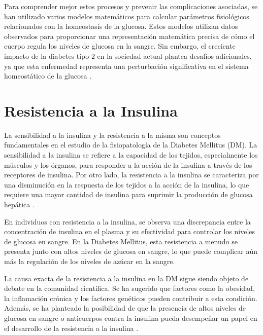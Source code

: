 Para comprender mejor estos procesos y prevenir las complicaciones asociadas, se han utilizado varios modelos matemáticos para calcular parámetros fisiológicos relacionados con la homeostasis de la glucosa. Estos modelos utilizan datos observados para proporcionar una representación matemática precisa de cómo el cuerpo regula los niveles de glucosa en la sangre. Sin embargo, el creciente impacto de la diabetes tipo 2 en la sociedad actual plantea desafíos adicionales, ya que esta enfermedad representa una perturbación significativa en el sistema homeostático de la glucosa \cite{ModelacionMatematica2020}.


\section{Resistencia a la Insulina}

La sensibilidad a la insulina y la resistencia a la misma son conceptos fundamentales en el estudio de la fisiopatología de la Diabetes Mellitus (DM). La sensibilidad a la insulina se refiere a la capacidad de los tejidos, especialmente los músculos y los órganos, para responder a la acción de la insulina a través de los receptores de insulina. Por otro lado, la resistencia a la insulina se caracteriza por una disminución en la respuesta de los tejidos a la acción de la insulina, lo que requiere una mayor cantidad de insulina para suprimir la producción de glucosa hepática \cite{MedicionEstimacion}.

En individuos con resistencia a la insulina, se observa una discrepancia entre la concentración de insulina en el plasma y su efectividad para controlar los niveles de glucosa en sangre. En la Diabetes Mellitus, esta resistencia a menudo se presenta junto con altos niveles de glucosa en sangre, lo que puede complicar aún más la regulación de los niveles de azúcar en la sangre.

La causa exacta de la resistencia a la insulina en la DM sigue siendo objeto de debate en la comunidad científica. Se ha sugerido que factores como la obesidad, la inflamación crónica y los factores genéticos pueden contribuir a esta condición. Además, se ha planteado la posibilidad de que la presencia de altos niveles de glucosa en sangre o anticuerpos contra la insulina pueda desempeñar un papel en el desarrollo de la resistencia a la insulina \cite{MedicionEstimacion}.

